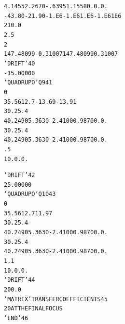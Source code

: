 \begin{tiny}
\begin{alltt}
    4  .1455   2.2670  -.6395  1.1558  0. 0.  0.                                
   -43.80  -21.90 -1.E6 -1.E6  1.E6 -1.E6 1E6
    2 10.0
     2.5                                                                        
    2                                                       
    147.48099   -0.31007  147.48099    0.31007                                  
   'DRIFT'                                                                40
   -15.00000                                                                    
   'QUADRUPO'                            Q9                               41
   0                                                        
    35.56  12.7  -13.69  -13.91                                                 
    30.  25.4                                                                   
    4    0.2490   5.3630  -2.4100   0.9870   0.   0.                            
    30.  25.4                                                                   
    4    0.2490   5.3630  -2.4100   0.9870   0.   0.                            
     .5                                                                         
    1  0. 0. 0.                                                                 
\end{alltt}
\onecolumn
\clearpage
\begin{alltt}
   'DRIFT'                                                                42
     25.00000                                                                   
   'QUADRUPO'                            Q10                              43
   0                                                        
     35.56  12.7  11.97                                                         
    30.  25.4                                                                   
    4    0.2490   5.3630  -2.4100   0.9870   0.   0.                            
    30.  25.4                                                                   
    4    0.2490   5.3630  -2.4100   0.9870   0.   0.                            
     1.1                                                                        
    1  0. 0. 0.                                                                 
   'DRIFT'                                                                44
    200.0                                                                       
   'MATRIX'                              TRANSFER  COEFFICIENTS           45
   2 0                                   AT  THE  FINAL  FOCUS                  
   'END'                                                                  46
\end{alltt}


\end{tiny}
